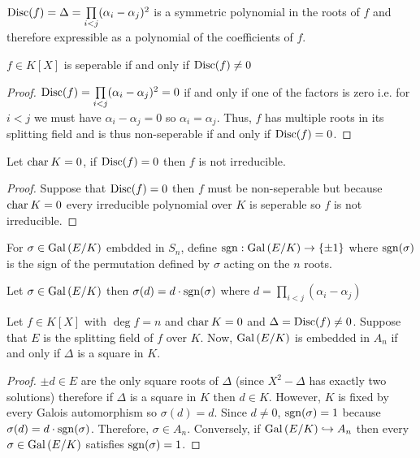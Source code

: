 \documentclass[12pt]{extarticle}
\begin{document}
\begin{definition}
$\mathrm{Disc}(f) = \Delta = \prod\limits_{i < j} (\alpha_i - \alpha_j)^2$ is a symmetric polynomial in the roots of $f$ and therefore expressible as a polynomial of the coefficients of $f$. 
\end{definition}

\begin{proposition}
$f \in K[X]$ is seperable if and only if $\mathrm{Disc}(f) \neq 0$
\end{proposition}

\begin{proof}
$\mathrm{Disc}(f) = \prod\limits_{i < j} (\alpha_i - \alpha_j)^2 = 0$ if and only if one of the factors is zero i.e. for $i < j$ we must have $\alpha_i - \alpha_j = 0$ so $\alpha_i = \alpha_j$. Thus, $f$ has multiple roots in its splitting field and is thus non-seperable if and only if $\mathrm{Disc}(f) = 0$. 
\end{proof}

\begin{corollary}
Let $\mathrm{char} \: K = 0$, if $\mathrm{Disc}(f) = 0$ then $f$ is not irreducible. 
\end{corollary}

\begin{proof}
Suppose that $\mathrm{Disc}(f) = 0$ then $f$ must be non-seperable but because $\mathrm{char} \: K = 0$ every irreducible polynomial over $K$ is seperable so $f$ is not irreducible. 
\end{proof}

\begin{definition}
For $\sigma \in \mathrm{Gal}\left( E/K \right)$ embdded in $S_n$, define $\mathrm{sgn} : \mathrm{Gal}\left( E/K \right) \to \{\pm 1\}$ where $\mathrm{sgn}(\sigma)$ is the sign of the permutation defined by $\sigma$ acting on the $n$ roots.
\end{definition}

\begin{lemma}
Let $\sigma \in \mathrm{Gal}\left( E/K \right)$ then $\sigma(d) = d \cdot \mathrm{sgn}(\sigma)$ where $d = \prod\limits_{i < j} (\alpha_i - \alpha_j)$
\end{lemma}

\begin{theorem}
Let $f \in K[X]$ with $\deg{f} = n$ and $\mathrm{char} \: K = 0$ and $\Delta = \mathrm{Disc}(f) \neq 0$. Suppose that $E$ is the splitting field of $f$ over $K$. Now, $\mathrm{Gal}\left( E/K \right)$ is embedded in $A_n$ if and only if $\Delta$ is a square in $K$.
\end{theorem}

\begin{proof}
$\pm d \in E$ are the only square roots of $\Delta$ (since $X^2 - \Delta$ has exactly two solutions) therefore if $\Delta$ is a square in $K$ then $d \in K$. However, $K$ is fixed by every Galois automorphism so $\sigma(d) = d$. Since $d \neq 0$, $\mathrm{sgn}(\sigma) = 1$ because $\sigma(d) = d \cdot \mathrm{sgn}(\sigma)$. Therefore, $\sigma \in A_n$. Conversely, if $\mathrm{Gal}\left( E/K \right) \hookrightarrow A_n$ then every $\sigma \in \mathrm{Gal}\left( E/K \right)$ satisfies $\mathrm{sgn}(\sigma) = 1$.  
\end{proof}
\end{document}
